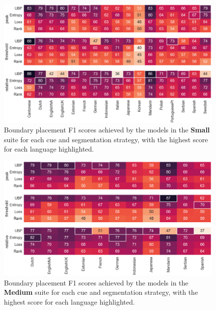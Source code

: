 \begin{figure}
    \centering
    \includegraphics[width=0.99\linewidth]{Figures/15Phonology/small.png}
    \caption{Boundary placement F1 scores achieved by the models in the \textbf{Small} suite for each cue and segmentation strategy, with the highest score for each language highlighted.}
    \label{fig:15-small}
\end{figure}

\begin{figure}
    \centering
    \includegraphics[width=0.99\linewidth]{Figures/15Phonology/medium.png}
    \caption{Boundary placement F1 scores achieved by the models in the \textbf{Medium} suite for each cue and segmentation strategy, with the highest score for each language highlighted.}
    \label{fig:15-medium}
\end{figure}

